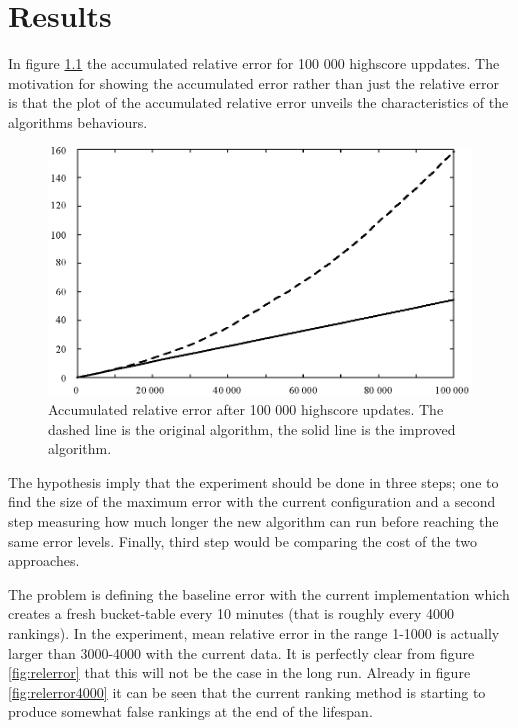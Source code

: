 \chapter{Results}

In figure \ref{fig:rel-error-100000} the accumulated relative error for 100 000 highscore uppdates. The motivation for showing the accumulated error rather than just the relative error is that the plot of the accumulated relative error unveils the characteristics of the algorithms behaviours.

\begin{figure}[h!]
  \centering
  \caption{Accumulated relative error after 100 000 highscore updates. The dashed line is the original algorithm, the solid line is the improved algorithm.}
  \label{fig:rel-error-100000}
  \includegraphics[width=12cm]{img/rel-error-100000.eps}
\end{figure}





The hypothesis imply that the experiment should be done in three steps; one to find the size of the maximum error with the current configuration and a second step measuring how much longer the new algorithm can run before reaching the same error levels. Finally, third step would be comparing the cost of the two approaches.

The problem is defining the baseline error with the current implementation which creates a fresh bucket-table every 10 minutes (that is roughly every 4000 rankings). In the experiment, mean relative error in the range 1-1000 is actually larger than 3000-4000 with the current data. It is perfectly clear from figure \ref{fig:relerror} that this will not be the case in the long run. Already in figure \ref{fig:relerror4000} it can be seen that the current ranking method is starting to produce somewhat false rankings at the end of the lifespan.

